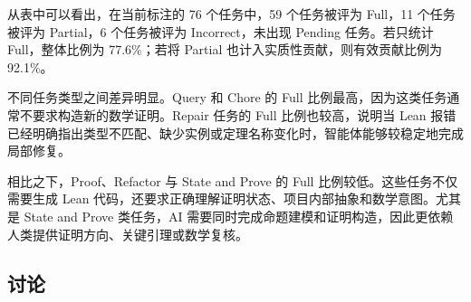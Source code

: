 \begin{table}[H]
  \centering
  \caption{AI 辅助形式化任务级评价结果}
  \label{tab:ai-task-results}
  \small
\end{table}

从表中可以看出，在当前标注的 76 个任务中，59 个任务被评为 Full，11 个任务被评为 Partial，6 个任务被评为 Incorrect，未出现 Pending 任务。若只统计 Full，整体比例为 77.6\%；若将 Partial 也计入实质性贡献，则有效贡献比例为 92.1\%。

不同任务类型之间差异明显。Query 和 Chore 的 Full 比例最高，因为这类任务通常不要求构造新的数学证明。Repair 任务的 Full 比例也较高，说明当 Lean 报错已经明确指出类型不匹配、缺少实例或定理名称变化时，智能体能够较稳定地完成局部修复。

相比之下，Proof、Refactor 与 State and Prove 的 Full 比例较低。这些任务不仅需要生成 Lean 代码，还要求正确理解证明状态、项目内部抽象和数学意图。尤其是 State and Prove 类任务，AI 需要同时完成命题建模和证明构造，因此更依赖人类提供证明方向、关键引理或数学复核。

\subsection{讨论}


